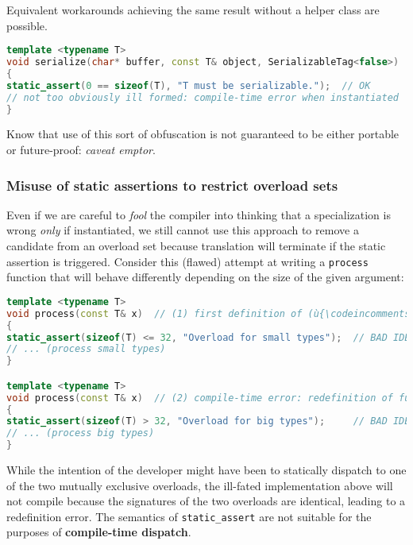 Equivalent workarounds achieving the same result without a
helper class are possible.

\begin{lstlisting}[language=C++]
template <typename T>
void serialize(char* buffer, const T& object, SerializableTag<false>)  // (2)
{
static_assert(0 == sizeof(T), "T must be serializable.");  // OK
// not too obviously ill formed: compile-time error when instantiated
}
\end{lstlisting}

\noindent Know that use of this sort of obfuscation is not guaranteed to be either
portable or future-proof: \emph{caveat emptor}.

\subsubsection[Misuse of static assertions to restrict overload sets]{Misuse of static assertions to restrict overload sets}\label{misuse-of-static-assertions-to-restrict-overload-sets}

Even if we are careful to \emph{fool} the compiler into thinking that a
specialization is wrong \emph{only} if instantiated, we still cannot use
this approach to remove a candidate from an overload set because translation
will terminate if the static assertion is triggered. Consider this
(flawed) attempt at writing a \texttt{process} function that will behave
differently depending on the size of the given argument:

\begin{lstlisting}[language=C++]
template <typename T>
void process(const T& x)  // (1) first definition of (ù{\codeincomments{process}}ù) function
{
static_assert(sizeof(T) <= 32, "Overload for small types");  // BAD IDEA
// ... (process small types)
}

template <typename T>
void process(const T& x)  // (2) compile-time error: redefinition of function
{
static_assert(sizeof(T) > 32, "Overload for big types");     // BAD IDEA
// ... (process big types)
}
\end{lstlisting}

\noindent While the intention of the developer might have been to statically
dispatch to one of the two mutually exclusive overloads, the ill-fated
implementation above will not compile because the signatures of the two
overloads are identical, leading to a redefinition error. The semantics
of \texttt{static\_assert} are not suitable for the purposes of
\textbf{compile-time dispatch}.

